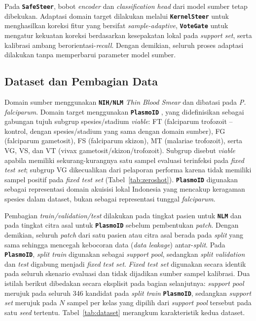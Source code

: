 \documentclass[conference]{IEEEtran}
\newcommand{\nama}[1]{\textbf{\texttt{#1}}}
\begin{document}
Pada \nama{SafeSteer}, bobot \textit{encoder} dan
\textit{classification head} dari model sumber tetap dibekukan.
Adaptasi domain target dilakukan melalui \nama{KernelSteer} untuk
menghasilkan koreksi fitur yang bersifat
\textit{sample-adaptive}, \nama{VoteGate} untuk mengatur kekuatan
koreksi berdasarkan kesepakatan lokal pada \textit{support set},
serta kalibrasi ambang berorientasi-\textit{recall}. Dengan
demikian, seluruh proses adaptasi dilakukan tanpa memperbarui
parameter model sumber.

\subsection{Dataset dan Pembagian Data}
Domain sumber menggunakan \nama{NIH/NLM} \textit{Thin Blood Smear} \cite{b15} dan dibatasi pada \textit{P. falciparum}. Domain target menggunakan \nama{PlasmoID} \cite{b22}, yang didefinisikan sebagai gabungan tujuh subgrup spesies/stadium \textit{viable}: FT (falciparum trofozoit -- kontrol, dengan spesies/stadium yang sama dengan domain sumber), FG (falciparum gametosit), FS (falciparum skizon), MT (malariae trofozoit), serta VG, VS, dan VT (vivax gametosit/skizon/trofozoit). Subgrup disebut \textit{viable} apabila memiliki sekurang-kurangnya satu sampel evaluasi terinfeksi pada \textit{fixed test set}; subgrup VG dikecualikan dari pelaporan performa karena tidak memiliki sampel positif pada \textit{fixed test set} (Tabel~\ref{tab:zeroshot}). \nama{PlasmoID} digunakan sebagai representasi domain akuisisi lokal Indonesia yang mencakup keragaman spesies dalam dataset, bukan sebagai representasi tunggal \textit{falciparum}.

Pembagian \textit{train/validation/test} dilakukan pada tingkat pasien untuk \nama{NLM} dan pada tingkat citra asal untuk \nama{PlasmoID} sebelum pembentukan \textit{patch}. Dengan demikian, seluruh \textit{patch} dari satu pasien atau citra asal berada pada \textit{split} yang sama sehingga mencegah kebocoran data (\textit{data leakage}) antar-\textit{split}. Pada \nama{PlasmoID}, \textit{split train} digunakan sebagai \textit{support pool}, sedangkan \textit{split validation} dan \textit{test} digabung menjadi \textit{fixed test set}. \textit{Fixed test set} digunakan secara identik pada seluruh skenario evaluasi dan tidak dijadikan sumber sampel kalibrasi. Dua istilah berikut dibedakan secara eksplisit pada bagian selanjutnya: \textit{support pool} merujuk pada seluruh 346 kandidat pada \textit{split train} \nama{PlasmoID}, sedangkan \textit{support set} merujuk pada $N$ sampel per kelas yang dipilih dari \textit{support pool} tersebut pada satu \textit{seed} tertentu. Tabel~\ref{tab:dataset} merangkum karakteristik kedua dataset.
\end{document}
